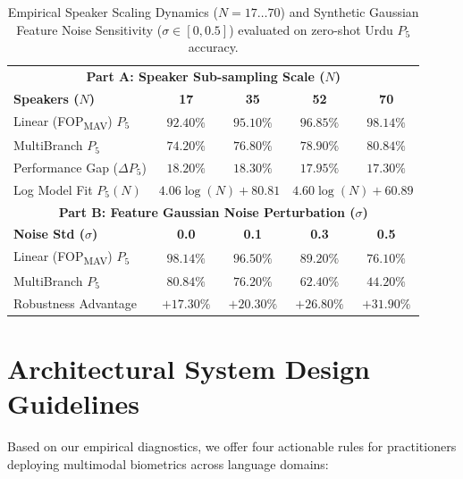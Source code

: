 \documentclass[conference]{IEEEtran}
\newcommand{\fopmav}{FOP\textsubscript{MAV}}
\begin{document}
\begin{table}[t]
\caption{Empirical Speaker Scaling Dynamics ($N=17 \dots 70$) and Synthetic Gaussian Feature Noise Sensitivity ($\sigma \in [0, 0.5]$) evaluated on zero-shot Urdu $P_5$ accuracy.}
\label{tab:scaling_summary}
\begin{center}
\begin{tabular}{lcccc}
\toprule
\multicolumn{5}{c}{\textbf{Part A: Speaker Sub-sampling Scale ($N$)}} \\
\textbf{Speakers ($N$)} & \textbf{17} & \textbf{35} & \textbf{52} & \textbf{70} \\
\midrule
Linear (\fopmav{}) $P_5$ & $92.40\%$ & $95.10\%$ & $96.85\%$ & $98.14\%$ \\
MultiBranch $P_5$ & $74.20\%$ & $76.80\%$ & $78.90\%$ & $80.84\%$ \\
Performance Gap ($\Delta P_5$) & $18.20\%$ & $18.30\%$ & $17.95\%$ & $17.30\%$ \\
Log Model Fit $P_5(N)$ & \multicolumn{2}{c}{$4.06 \log(N) + 80.81$} & \multicolumn{2}{c}{$4.60 \log(N) + 60.89$} \\
\midrule
\multicolumn{5}{c}{\textbf{Part B: Feature Gaussian Noise Perturbation ($\sigma$)}} \\
\textbf{Noise Std ($\sigma$)} & \textbf{0.0} & \textbf{0.1} & \textbf{0.3} & \textbf{0.5} \\
\midrule
Linear (\fopmav{}) $P_5$ & $98.14\%$ & $96.50\%$ & $89.20\%$ & $76.10\%$ \\
MultiBranch $P_5$ & $80.84\%$ & $76.20\%$ & $62.40\%$ & $44.20\%$ \\
Robustness Advantage & $+17.30\%$ & $+20.30\%$ & $+26.80\%$ & \textbf{$+31.90\%$} \\
\bottomrule
\end{tabular}
\end{center}
\end{table}

\section{Architectural System Design Guidelines}
\label{sec:design_guidelines}

Based on our empirical diagnostics, we offer four actionable rules for practitioners deploying multimodal biometrics across language domains:
\end{document}
